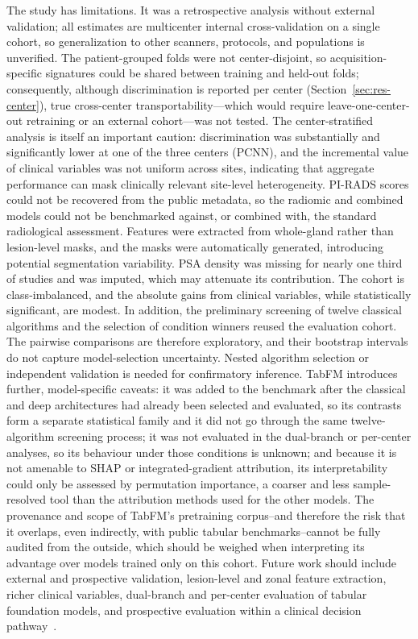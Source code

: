 \documentclass[11pt]{article}
\begin{document}
The study has limitations. It was a retrospective analysis without external
validation; all estimates are multicenter internal cross-validation on a single
cohort, so generalization to other scanners, protocols, and populations is
unverified. The patient-grouped folds were not center-disjoint, so
acquisition-specific signatures could be shared between training and held-out
folds; consequently, although discrimination is reported per center
(Section~\ref{sec:res-center}), true cross-center transportability---which would
require leave-one-center-out retraining or an external cohort---was not tested.
The center-stratified analysis is itself an important caution: discrimination was
substantially and significantly lower at one of the three centers (PCNN), and the
incremental value of clinical variables was not uniform across sites, indicating
that aggregate performance can mask clinically relevant site-level
heterogeneity. PI-RADS scores could not be recovered from the public metadata, so
the radiomic and combined models could not be benchmarked against, or combined
with, the standard radiological assessment.
Features were extracted from whole-gland rather than lesion-level masks, and the
masks were automatically generated, introducing potential segmentation
variability. PSA density was missing for nearly one third of studies and was
imputed, which may attenuate its contribution. The cohort is class-imbalanced,
and the absolute gains from clinical variables, while statistically significant,
are modest. In addition, the preliminary screening of twelve classical
algorithms and the selection of condition winners reused the evaluation cohort.
The pairwise comparisons are therefore exploratory, and their bootstrap
intervals do not capture model-selection uncertainty. Nested algorithm selection
or independent validation is needed for confirmatory inference. TabFM introduces
further, model-specific caveats: it was added to the benchmark after the
classical and deep architectures had already been selected and evaluated, so
its contrasts form a separate statistical family and it did not go through the
same twelve-algorithm screening process; it was not evaluated in the
dual-branch or per-center analyses, so its behaviour under those conditions is
unknown; and because it is not amenable to SHAP or integrated-gradient
attribution, its interpretability could only be assessed by permutation
importance, a coarser and less sample-resolved tool than the attribution
methods used for the other models. The provenance and scope of TabFM's
pretraining corpus--and therefore the risk that it overlaps, even indirectly,
with public tabular benchmarks--cannot be fully audited from the outside, which
should be weighed when interpreting its advantage over models trained only on
this cohort. Future work
should include external and prospective validation,
lesion-level and zonal feature extraction, richer clinical variables,
dual-branch and per-center evaluation of tabular foundation models, and
prospective evaluation within a clinical decision pathway~\citep{Quality2022,Lucia2024}.
\end{document}
